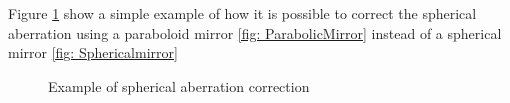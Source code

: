 Figure \ref{fig :spher abb corr} show a simple example of how it is possible to correct the spherical aberration using a paraboloid mirror \ref{fig: ParabolicMirror} instead of a spherical mirror \ref{fig: Sphericalmirror}
\begin{figure}[]
%
\centering
%
\quad
%
%
\caption{Example of spherical aberration correction}
\label{fig :spher abb corr}
%
\end{figure}

